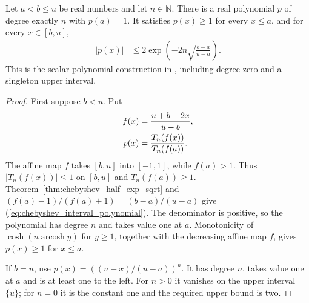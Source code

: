 \begin{theorem}
    \label{thm:chebyshev_interval_polynomial}
    \leanok
    Let $a<b\le u$ be real numbers and let $n\in\mathbb N$.
    There is a real polynomial $p$ of degree exactly $n$ with $p(a)=1$.
    It satisfies $p(x)\ge1$ for every $x\le a$, and for every $x\in[b,u]$,
    \begin{align}
        |p(x)| & \le2\exp\left(-2n\sqrt{\frac{b-a}{u-a}}\right).
        \label{eq:chebyshev_interval_polynomial}
    \end{align}
    This is the scalar polynomial construction in
    \cite{Arad2013AreaLaw,Arad2016RigorousRG}, including degree zero and
    a singleton upper interval.
\end{theorem}
\begin{proof}\leanok
    First suppose $b<u$. Put
    \begin{align}
        f(x) & =\frac{u+b-2x}{u-b},\notag          \\
        p(x) & =\frac{T_n(f(x))}{T_n(f(a))}.\notag
    \end{align}
    The affine map $f$ takes $[b,u]$ into $[-1,1]$, while $f(a)>1$.
    Thus $|T_n(f(x))|\le1$ on $[b,u]$ and $T_n(f(a))\ge1$.
    Theorem~\ref{thm:chebyshev_half_exp_sqrt} and
    $(f(a)-1)/(f(a)+1)=(b-a)/(u-a)$ give
    (\ref{eq:chebyshev_interval_polynomial}).
    The denominator is positive, so the polynomial has degree $n$ and
    takes value one at $a$. Monotonicity of $\cosh(n\operatorname{arcosh}y)$
    for $y\ge1$, together with the decreasing affine map $f$, gives
    $p(x)\ge1$ for $x\le a$.

    If $b=u$, use $p(x)=((u-x)/(u-a))^n$.
    It has degree $n$, takes value one at $a$ and is at least one to the left.
    For $n>0$ it vanishes on the upper interval $\{u\}$; for $n=0$ it is
    the constant one and the required upper bound is two.
\end{proof}


